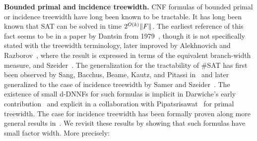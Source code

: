 \documentclass[a4paper,UKenglish,cleveref, autoref, thm-restate]{lipics-v2021}
\begin{document}
\textbf{Bounded primal and incidence treewidth.} CNF formulas of bounded primal or incidence treewidth have long been known to be tractable. It has long been known that SAT can be solved in time $2^{O(k)} \|F\|$. The earliest reference of this fact seems to be in a paper by Dantsin from 1979~\cite{dantsin1979parameters}, though it is not specifically stated with the treewidth terminology, later improved by Alekhnovich and Razborov~\cite{AlekhnovichR11, alekhnovich2002satisfiability}, where the result is expressed in terms of the equivalent branch-width measure, and Szeider~\cite{Szeider04}. The generalization for the tractability of \#SAT has first been observed by Sang, Bacchus, Beame, Kautz, and Pitassi in~\cite{sang04} and later generalized to the case of incidence treewidth by Samer and Szeider~\cite{SamerS10}. The existence of small d-DNNFs for such formulas is implicit in Darwiche's early contribution~\cite{Darwiche04} and explicit in a collaboration with Pipatsrisawat~\cite{PipatsrisawatD10} for primal treewidth. The case for incidence treewidth has been formally proven along more general results in~\cite{BovaCMS15}.
%
We revisit these results by showing that such formulas have small factor width. More precisely:
\end{document}
